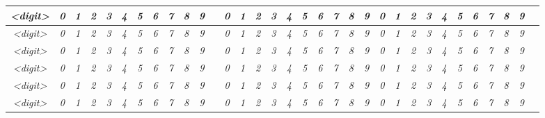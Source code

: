 \documentclass[10pt,twoside,a4paper]{memoir}
\begin{document}
\begin{center}
\begin{tabular}{ |c||c|c|c|c|c|c|c|c|c|c|c|c|c|c|c|c|c|c|c|c|c|c|c|c|c|c|c|c|c|c|c|c| }
\textsl{\textless digit\textgreater} & \textit{0} & \textit{1} & \textit{2} & \textit{3} & \textit{4} & \textit{5} & \textit{6} & \textit{7} & \textit{8} & \textit{9} &  & \textit{0} & \textit{1} & \textit{2} & \textit{3} & \textit{4} & \textit{5} & \textit{6} & \textit{7} & \textit{8} & \textit{9} & \textit{0} & \textit{1} & \textit{2} & \textit{3} & \textit{4} & \textit{5} & \textit{6} & \textit{7} & \textit{8} & \textit{9} & \\ \hline
\textsl{\textless digit\textgreater} & \textit{0} & \textit{1} & \textit{2} & \textit{3} & \textit{4} & \textit{5} & \textit{6} & \textit{7} & \textit{8} & \textit{9} &  & \textit{0} & \textit{1} & \textit{2} & \textit{3} & \textit{4} & \textit{5} & \textit{6} & \textit{7} & \textit{8} & \textit{9} & \textit{0} & \textit{1} & \textit{2} & \textit{3} & \textit{4} & \textit{5} & \textit{6} & \textit{7} & \textit{8} & \textit{9} & \\ \hline
\textsl{\textless digit\textgreater} & \textit{0} & \textit{1} & \textit{2} & \textit{3} & \textit{4} & \textit{5} & \textit{6} & \textit{7} & \textit{8} & \textit{9} &  & \textit{0} & \textit{1} & \textit{2} & \textit{3} & \textit{4} & \textit{5} & \textit{6} & \textit{7} & \textit{8} & \textit{9} & \textit{0} & \textit{1} & \textit{2} & \textit{3} & \textit{4} & \textit{5} & \textit{6} & \textit{7} & \textit{8} & \textit{9} & \\ \hline
\textsl{\textless digit\textgreater} & \textit{0} & \textit{1} & \textit{2} & \textit{3} & \textit{4} & \textit{5} & \textit{6} & \textit{7} & \textit{8} & \textit{9} &  & \textit{0} & \textit{1} & \textit{2} & \textit{3} & \textit{4} & \textit{5} & \textit{6} & \textit{7} & \textit{8} & \textit{9} & \textit{0} & \textit{1} & \textit{2} & \textit{3} & \textit{4} & \textit{5} & \textit{6} & \textit{7} & \textit{8} & \textit{9} & \\ \hline
\textsl{\textless digit\textgreater} & \textit{0} & \textit{1} & \textit{2} & \textit{3} & \textit{4} & \textit{5} & \textit{6} & \textit{7} & \textit{8} & \textit{9} &  & \textit{0} & \textit{1} & \textit{2} & \textit{3} & \textit{4} & \textit{5} & \textit{6} & \textit{7} & \textit{8} & \textit{9} & \textit{0} & \textit{1} & \textit{2} & \textit{3} & \textit{4} & \textit{5} & \textit{6} & \textit{7} & \textit{8} & \textit{9} & \\ \hline
\textsl{\textless digit\textgreater} & \textit{0} & \textit{1} & \textit{2} & \textit{3} & \textit{4} & \textit{5} & \textit{6} & \textit{7} & \textit{8} & \textit{9} &  & \textit{0} & \textit{1} & \textit{2} & \textit{3} & \textit{4} & \textit{5} & \textit{6} & \textit{7} & \textit{8} & \textit{9} & \textit{0} & \textit{1} & \textit{2} & \textit{3} & \textit{4} & \textit{5} & \textit{6} & \textit{7} & \textit{8} & \textit{9} & \\ \hline

\end{tabular}
\end{center}
\end{document}
